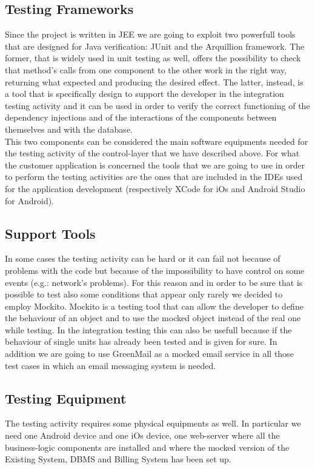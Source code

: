 \documentclass[a4paper,10pt]{article}
\begin{document}
\subsection{Testing Frameworks}
Since the project is written in JEE we are going to exploit two powerfull tools that are designed for Java verification: JUnit and the Arquillion framework. The former, that is 
widely used in unit testing as well, offers the possibility to check that method's calls from one component to the other work in the right way, returning what expected 
and producing the desired effect. The latter, instead, is a tool that is specifically design to support the developer in the integration testing activity and it
can be used in order to verify the correct functioning of the dependency injections and of the interactions of the components between themselves and 
with the database.\\ This two 
components can be considered the main software equipments needed for the testing activity of the control-layer that we have described above. 
For what the customer application is concerned the tools that we are going to use in order to perform the testing activities are the ones that are included in the IDEs used for 
the application development (respectively XCode for iOs and Android Studio for Android).
\subsection{Support Tools}
In some cases the testing activity can be hard or it can fail not because of problems with the code but because of the impossibility to have control on some events 
(e.g.: network's problems). For this reason and in order to be sure that is possible to test also some conditions that appear only rarely we decided to employ Mockito. Mockito
is a testing tool that can allow the developer to define the behaviour of an object and to use the mocked object instead of the real one while testing. In the integration 
testing this can also be usefull because if the behaviour of single units has already been tested and is given for sure. In addition we are going to use GreenMail as a mocked
email service in all those test cases in which an email messaging system is needed. 
\subsection{Testing Equipment} 
The testing activity requires some physical equipments as well. In particular we need one Android device and one iOs device, one web-server where all the business-logic components
are installed and where the mocked version of the Existing System, DBMS and Billing System has been set up.
\end{document}
